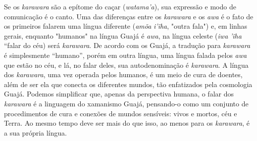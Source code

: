 Se os \emph{karawara} são a epítome do caçar (\emph{watama'a}), sua
expressão e modo de comunicação é o canto. Uma das diferenças entre os
\emph{karawara} e os \emph{awa} é o fato de os primeiros falarem uma
língua diferente (\emph{amõa} \emph{i'ĩha}, "outra fala") e, em linhas
gerais, enquanto "humanos" na língua Guajá é \emph{awa}, na língua
celeste (\emph{iwa} \emph{'ĩha} ``falar do céu) será \emph{karawara}. De
acordo com os Guajá, a tradução para \emph{karawara} é simplesmente
``humano'', porém em outra língua, uma língua falada pelos \emph{awa}
que estão no céu, e lá, no falar deles, sua autodenominação é
\emph{karawara}. A língua dos \emph{karawara}, uma vez operada pelos
humanos, é um meio de cura de doentes, além de ser ela que conecta os
diferentes mundos, tão enfatizados pela cosmologia Guajá. Podemos
simplificar que, apenas da perspectiva humana, o falar dos
\emph{karawara} é a linguagem do xamanismo Guajá, pensando-o como um
conjunto de procedimentos de cura e conexões de mundos sensíveis: vivos
e mortos, céu e Terra. Ao mesmo tempo deve ser mais do que isso, ao
menos para os \emph{karawara}, é a sua própria língua.

